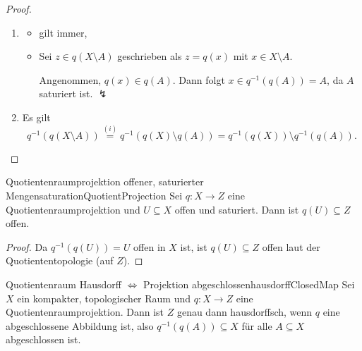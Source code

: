 \documentclass[language=ngerman]{TemplateLecture} %
\begin{document}
\begin{proof}
    \begin{enumerate}[$(i)$]
        \item \begin{itemize}
            \item[\enquote{$\supseteq$}:] gilt immer,
            \item[\enquote{$\subseteq$}:] Sei $z \in q(X \setminus A)$ geschrieben als $z = q(x)$ mit $x \in X \setminus A$.
            
            Angenommen, $q(x) \in q(A)$. Dann folgt $x \in q^{-1}(q(A)) = A$, da $A$ saturiert ist. $\lightning$
        \end{itemize}
        \item Es gilt 
        \begin{equation*}
            q^{-1}(q(X \setminus A)) \overset{(i)}{=} q^{-1}(q(X) \setminus q(A)) = q^{-1}(q(X)) \setminus q^{-1}(q(A)).
        \end{equation*}
    \end{enumerate}
\end{proof}

\begin{lem}{Quotientenraumprojektion offener, saturierter Mengen}{saturationQuotientProjection}
    Sei $q: X \to Z$ eine Quotientenraumprojektion und $U \subseteq X$ offen und saturiert. Dann ist $q(U) \subseteq Z$ offen.
\end{lem}

\begin{proof}
    Da $q^{-1}(q(U)) = U$ offen in $X$ ist, ist $q(U) \subseteq Z$ offen laut der Quotiententopologie (auf $Z$).
\end{proof}

\begin{thm}{Quotientenraum Hausdorff $\Leftrightarrow$ Projektion abgeschlossen}{hausdorffClosedMap}
    Sei $X$ ein kompakter, topologischer Raum und $q: X \to Z$ eine Quotientenraumprojektion. Dann ist $Z$ genau dann hausdorffsch, wenn $q$ eine abgeschlossene Abbildung ist, also $q^{-1}(q(A)) \subseteq X$ für alle $A \subseteq X$ abgeschlossen ist.
\end{thm}

\end{document}
